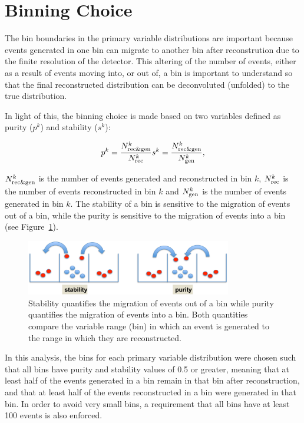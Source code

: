 \section{Binning Choice}
\label{s:binning_choice}
The bin boundaries in the primary variable distributions are important because events generated in one bin can
migrate to another bin after reconstrution due to the finite resolution of the detector. This altering of the
number of events, either as a result of events moving into, or out of, a bin is important to understand so
that the final reconstructed distribution can be deconvoluted (unfolded) to the true distribution.

In light of this, the binning choice is made based on two variables defined as purity ($p^k$) and stability
($s^k$):

\begin{eqnarray}
\label{eq:purity_and_stability}
p^k = \frac{N_{\mathrm{rec}\&\mathrm{gen}}^k}{N_{\mathrm{rec}}^k}
s^k = \frac{N_{\mathrm{rec}\&\mathrm{gen}}^k}{N_{\mathrm{gen}}^k}
,
\end{eqnarray}

$N_{\mathrm{rec}\&\mathrm{gen}}^k$ is the number of events generated and reconstructed in bin $k$,
$N_{\mathrm{rec}}^k$ is the number of events reconstructed in bin $k$ and $N_{\mathrm{gen}}^k$ is the number of events
generated in bin $k$. The stability of a bin is sensitive to the migration of events out of a bin, while
the purity is sensitive to the migration of events into a bin (see Figure~\ref{fig:purity_and_stability}).

\begin{figure}[hbtp]
	\centering
     \includegraphics[width=0.8\textwidth]{Chapters/04_Analysis/04b_XSections/images/purity_and_stability.pdf}
     \caption{Stability quantifies the migration of events out of a bin while purity quantifies the migration
     of events into a bin. Both quantities compare the variable range (bin) in which an event is generated to
     the range in which they are reconstructed.}
     \label{fig:purity_and_stability}
 \end{figure}

In this analysis, the bins for each primary variable distribution were chosen such that all bins have purity
and stability values of 0.5 or greater, meaning that at least half of the events generated in a bin remain in that bin
after reconstruction, and that at least half of the events reconstructed in a bin were generated in that bin.
In order to avoid very small bins, a requirement that all bins have at least 100 events is also enforced.

